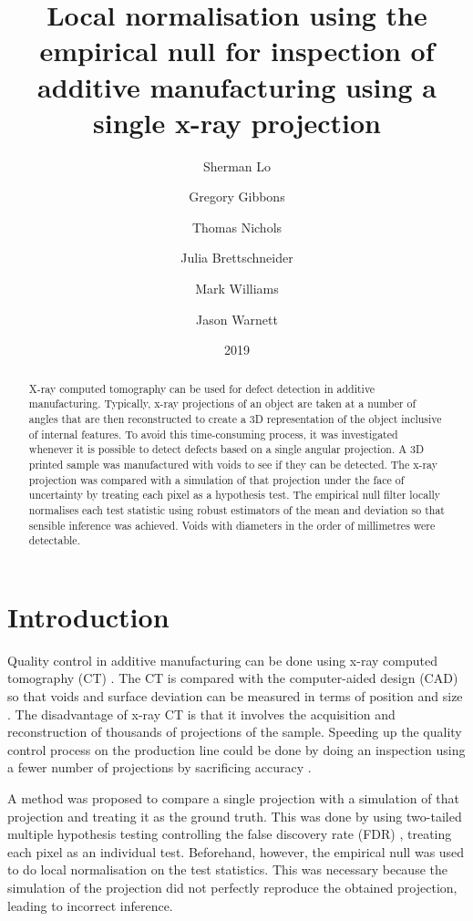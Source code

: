 \documentclass{proc}
\title{Local normalisation using the empirical null for inspection of additive manufacturing using a single x-ray projection}
\date{2019}
\author{
  Sherman Lo \and Gregory Gibbons \and Thomas Nichols \and Julia Brettschneider \and Mark Williams \and Jason Warnett
}
\begin{document}
\sloppy

\maketitle

\begin{abstract}
X-ray computed tomography can be used for defect detection in additive manufacturing. Typically, x-ray projections of an object are taken at a number of angles that are then reconstructed to create a 3D representation of the object inclusive of internal features. To avoid this time-consuming process, it was investigated whenever it is possible to detect defects based on a single angular projection. A 3D printed sample was manufactured with voids to see if they can be detected. The x-ray projection was compared with a simulation of that projection under the face of uncertainty by treating each pixel as a hypothesis test. The empirical null filter locally normalises each test statistic using robust estimators of the mean and deviation so that sensible inference was achieved. Voids with diameters in the order of millimetres were detectable.
\end{abstract}

\section{Introduction}

Quality control in additive manufacturing can be done using x-ray computed tomography (CT) \citep{thompson2016x}. The CT is compared with the computer-aided design (CAD) so that voids and surface deviation can be measured in terms of position and size \citep{villarraga2015assessing, lee2015compliance, kim2016inspection}. The disadvantage of x-ray CT is that it involves the acquisition and reconstruction of thousands of projections of the sample. Speeding up the quality control process on the production line could be done by doing an inspection using a fewer number of projections by sacrificing accuracy \citep{warnett2016towards, brierley2018optimized}.

A method was proposed to compare a single projection with a simulation of that projection and treating it as the ground truth. This was done by using two-tailed multiple hypothesis testing \citep{pearson1900on, neyman1933on, fisher1970statistical} controlling the false discovery rate (FDR) \citep{benjamini1995controlling, benjamini2010discovering}, treating each pixel as an individual test. Beforehand, however, the empirical null \citep{efron2004large} was used to do local normalisation on the test statistics. This was necessary because the simulation of the projection did not perfectly reproduce the obtained projection, leading to incorrect inference.
\end{document}
